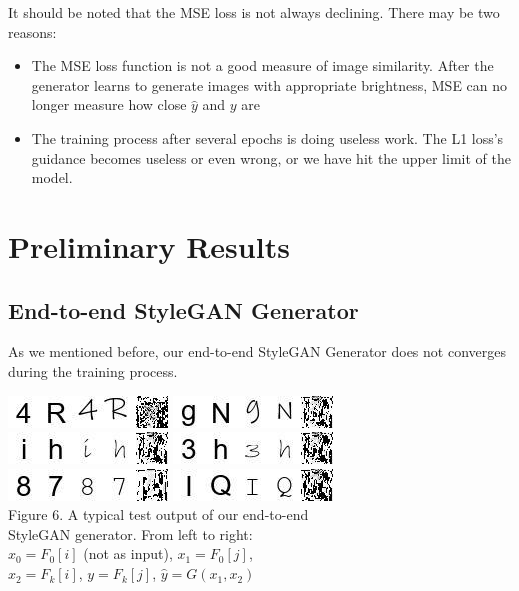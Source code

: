 \documentclass[letterpaper]{article}
\begin{document}
It should be noted that the MSE loss is not always declining. There may be two reasons:

\begin{itemize}
    \item The MSE loss function is not a good measure of image similarity. After the generator learns to generate images with appropriate brightness, MSE can no longer measure how close $\hat{y}$ and $y$ are
    \item The training process after several epochs is doing useless work. The L1 loss's guidance becomes useless or even wrong, or we have hit the upper limit of the model.
\end{itemize}


\section{Preliminary Results}
\subsection{End-to-end StyleGAN Generator}
As we mentioned before, our end-to-end StyleGAN Generator does not converges during the training process.

\begin{center}
    \includegraphics[width=.2\textwidth]{./update-figs/e2estylegan_1.jpg}
    \includegraphics[width=.2\textwidth]{./update-figs/e2estylegan_2.jpg}\\
    \includegraphics[width=.2\textwidth]{./update-figs/e2estylegan_3.jpg}
    \includegraphics[width=.2\textwidth]{./update-figs/e2estylegan_4.jpg}\\
    \includegraphics[width=.2\textwidth]{./update-figs/e2estylegan_5.jpg}
    \includegraphics[width=.2\textwidth]{./update-figs/e2estylegan_6.jpg}\\

    Figure 6. A typical test output of our end-to-end\\StyleGAN generator. From left to right:\\$x_0=F_0[i]$ (not as input), $x_1=F_0[j]$,\\$x_2=F_k[i]$, $y=F_k[j]$, $\hat{y}=G(x_1,x_2)$
\end{center}
\end{document}
